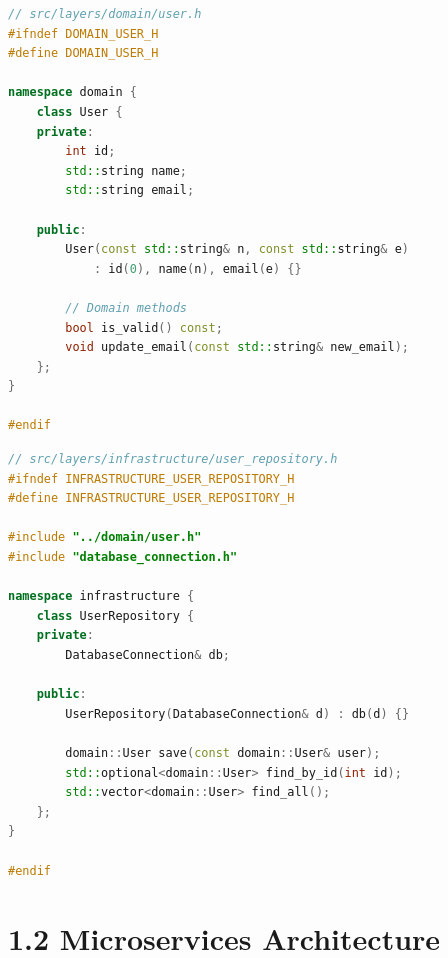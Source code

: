 \begin{lstlisting}[language={C++}]
// src/layers/domain/user.h
#ifndef DOMAIN_USER_H
#define DOMAIN_USER_H

namespace domain {
    class User {
    private:
        int id;
        std::string name;
        std::string email;
        
    public:
        User(const std::string& n, const std::string& e)
            : id(0), name(n), email(e) {}
        
        // Domain methods
        bool is_valid() const;
        void update_email(const std::string& new_email);
    };
}

#endif
\end{lstlisting}

\begin{lstlisting}[language={C++}]
// src/layers/infrastructure/user_repository.h
#ifndef INFRASTRUCTURE_USER_REPOSITORY_H
#define INFRASTRUCTURE_USER_REPOSITORY_H

#include "../domain/user.h"
#include "database_connection.h"

namespace infrastructure {
    class UserRepository {
    private:
        DatabaseConnection& db;
        
    public:
        UserRepository(DatabaseConnection& d) : db(d) {}
        
        domain::User save(const domain::User& user);
        std::optional<domain::User> find_by_id(int id);
        std::vector<domain::User> find_all();
    };
}

#endif
\end{lstlisting}

\hypertarget{microservices-architecture}{%
\section{1.2 Microservices
Architecture}\label{microservices-architecture}}

